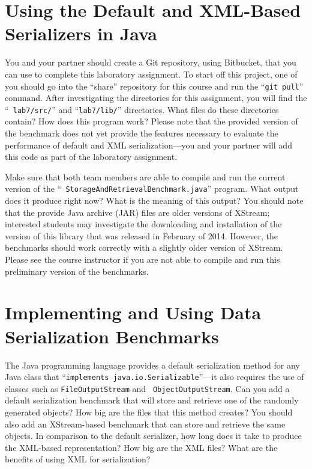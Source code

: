 \vspace*{-.05in}
\section*{Using the Default and XML-Based Serializers in Java}

You and your partner should create a Git repository, using Bitbucket, that you can use to complete this laboratory
assignment.  To start off this project, one of you should go into the ``share'' repository for this course and run the
``{\tt git pull}'' command. After investigating the directories for this assignment, you will find the ``{\tt
  lab7/src/}'' and ``{\tt lab7/lib/}'' directories. What files do these directories contain? How does this program work?
Please note that the provided version of the benchmark does not yet provide the features necessary to evaluate the
performance of default and XML serialization---you and your partner will add this code as part of the laboratory
assignment.

Make sure that both team members are able to compile and run the current version of the ``{\tt
  StorageAndRetrievalBenchmark.java}'' program. What output does it produce right now? What is the meaning of this
output? You should note that the provide Java archive (JAR) files are older versions of XStream; interested students may
investigate the downloading and installation of the version of this library that was released in February of 2014.
However, the benchmarks should work correctly with a slightly older version of XStream. Please see the course instructor
if you are not able to compile and run this preliminary version of the benchmarks.

\vspace*{-.05in}
\section*{Implementing and Using Data Serialization Benchmarks}

The Java programming language provides a default serialization method for any Java class that ``{\tt implements
  java.io.Serializable}''---it also requires the use of classes such as {\tt FileOutputStream} and {\tt
  ObjectOutputStream}. Can you add a default serialization benchmark that will store and retrieve one of the randomly
generated objects? How big are the files that this method creates?  You should also add an XStream-based benchmark that
can store and retrieve the same objects. In comparison to the default serializer, how long does it take to produce the
XML-based representation? How big are the XML files? What are the benefits of using XML for serialization?

